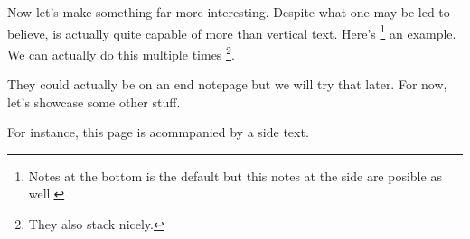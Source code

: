 \lipsum[1]
\footnotesinmargin
Now let's make something far more interesting. Despite what one may be led to believe, \LaTeXe is actually quite capable of more than vertical text. Here's \footnote{Notes at the bottom is the default but this notes at the side are posible as well.} an example. We can actually do this multiple times \footnote{They also stack nicely.}.

They could actually be on an end notepage but we will try that later. For now, let's showcase some other stuff.

\lipsum[1-3]

For instance, this page is acommpanied by a side text.


\lipsum[4-10]